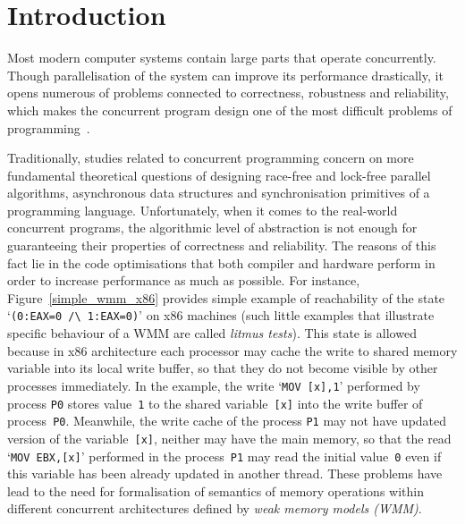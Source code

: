 
\chapter{Introduction}
\label{ch:intro}

Most modern computer systems contain large parts that operate concurrently. Though parallelisation of the system can improve its performance drastically, it opens numerous of problems connected to correctness, robustness and reliability, which makes the concurrent program design one of the most difficult problems of programming~\cite{mckenney2017parallel}.

Traditionally, studies related to concurrent programming concern on more fundamental theoretical questions of designing race-free and lock-free parallel algorithms, asynchronous data structures and synchronisation primitives of a programming language. Unfortunately, when it comes to the real-world concurrent programs, the algorithmic level of abstraction is not enough for guaranteeing their properties of correctness and reliability. The reasons of this fact lie in the code optimisations that both compiler and hardware perform in order to increase performance as much as possible. For instance, Figure~\ref{simple_wmm_x86} provides simple example of reachability of the state `\texttt{(0:EAX=0~/\textbackslash~1:EAX=0)}' on x86 machines (such little examples that illustrate specific behaviour of a WMM are called \textit{litmus tests}).
This state is allowed because in x86 architecture each processor may cache the write to shared memory variable into its local write buffer, so that they do not become visible by other processes immediately. In the example, the write `\texttt{MOV~[x],1}' performed by process \texttt{P0} stores value~\texttt{1} to the shared variable~\texttt{[x]} into the write buffer of process~\texttt{P0}. Meanwhile, the write cache of the process \texttt{P1} may not have updated version of the variable~\texttt{[x]}, neither may have the main memory, so that the read `\texttt{MOV~EBX,[x]}' performed in the process~\texttt{P1} may read the initial value~\texttt{0} even if this variable has been already updated in another thread. These problems have lead to the need for formalisation of semantics of memory operations within different concurrent architectures defined by \textit{weak	memory models (WMM)}.


